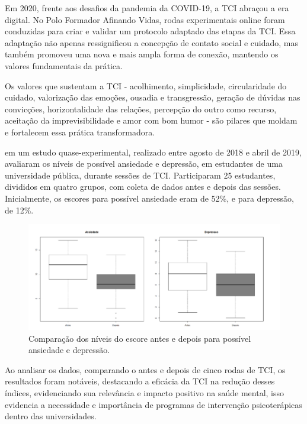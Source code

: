         Em 2020, frente aos desafios da pandemia da COVID-19, a TCI abraçou a era digital. No Polo Formador Afinando Vidas, rodas experimentais online foram conduzidas para criar e validar um protocolo adaptado das etapas da TCI. Essa adaptação não apenas ressignificou a concepção de contato social e cuidado, mas também promoveu uma nova e mais ampla forma de conexão, mantendo os valores fundamentais da prática. \cite{SILVAeOTAVIANO}
        
        Os valores que sustentam a TCI - acolhimento, simplicidade, circularidade do cuidado, valorização das emoções, ousadia e transgressão, geração de dúvidas nas convicções, horizontalidade das relações, percepção do outro como recurso, aceitação da imprevisibilidade e amor com bom humor - são pilares que moldam e fortalecem essa prática transformadora.\cite{SILVA}
        
        \cite{BOARETTO} em um estudo quase-experimental, realizado entre agosto de 2018 e abril de 2019, avaliaram os níveis de possível ansiedade e depressão, em estudantes de uma universidade pública, durante sessões de TCI. Participaram 25 estudantes, divididos em quatro grupos, com coleta de dados antes e depois das sessões. Inicialmente, os escores para possível ansiedade eram de 52\%, e para depressão, de 12\%.
        
            \begin{figure}[!h] %
                \centering
                \includegraphics[scale=0.5]{latex/figuras/boaretto.pdf}
                \caption[Terapia Comunitária Integrativa]%
                {Comparação dos níveis do escore antes e depois para possível ansiedade e depressão. \cite{BOARETTO}}%
            \end{figure}
        
        Ao analisar os dados, comparando o antes e depois de cinco rodas de TCI, os resultados foram notáveis, destacando a eficácia da TCI na redução desses índices, evidenciando sua relevância e impacto positivo na saúde mental, isso evidencia a necessidade e importância de programas de intervenção psicoterápicas dentro das universidades.\cite{BOARETTO}
        
